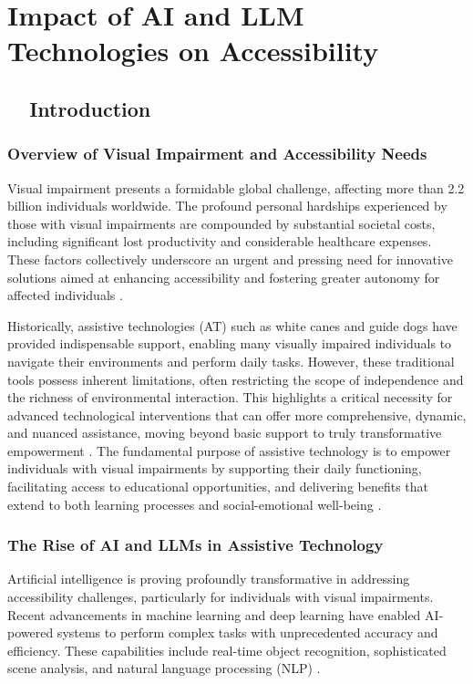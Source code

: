 \chapter{Impact of AI and LLM Technologies on Accessibility}\label{ch9:ai-llm}
\raggedright

\section{~~Introduction}\label{ch9:sec:introduction}

\subsection{Overview of Visual Impairment and Accessibility Needs}\label{ch9:ssec:overview}
Visual impairment presents a formidable global challenge, affecting more than 2.2 billion individuals worldwide. The profound personal hardships experienced by those with visual impairments are compounded by substantial societal costs, including significant lost productivity and considerable healthcare expenses. These factors collectively underscore an urgent and pressing need for innovative solutions aimed at enhancing accessibility and fostering greater autonomy for affected individuals \supercite{arxivvisualimpairment, WHO2021}.

Historically, assistive technologies (AT) such as white canes and guide dogs have provided indispensable support, enabling many visually impaired individuals to navigate their environments and perform daily tasks. However, these traditional tools possess inherent limitations, often restricting the scope of independence and the richness of environmental interaction. This highlights a critical necessity for advanced technological interventions that can offer more comprehensive, dynamic, and nuanced assistance, moving beyond basic support to truly transformative empowerment \supercite{aimodels2024}. The fundamental purpose of assistive technology is to empower individuals with visual impairments by supporting their daily functioning, facilitating access to educational opportunities, and delivering benefits that extend to both learning processes and social-emotional well-being \supercite{wjaets2024}.

\subsection{The Rise of AI and LLMs in Assistive Technology}\label{ch9:ssec:rise-of-ai}
Artificial intelligence is proving profoundly transformative in addressing accessibility challenges, particularly for individuals with visual impairments. Recent advancements in machine learning and deep learning have enabled AI-powered systems to perform complex tasks with unprecedented accuracy and efficiency. These capabilities include real-time object recognition, sophisticated scene analysis, and natural language processing (NLP) \supercite{arxivvisualimpairment}.

